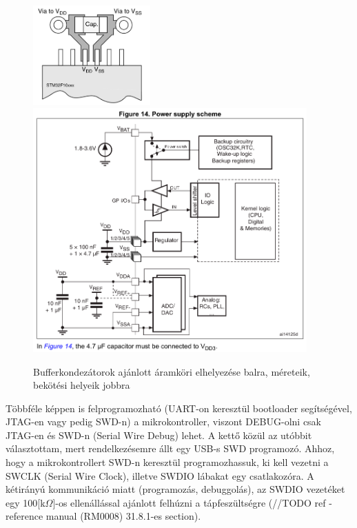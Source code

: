 \documentclass[../main.tex]{subfiles}
\begin{document}
            \begin{figure}[h!]
                \centering
                    \includegraphics[width=4.5cm]{resources/pcb_res/decoup_cap.png}
                    \includegraphics[width=10.5cm]{resources/pcb_res/power_sup_capacitors.png}
                \caption{Bufferkondezátorok ajánlott áramköri elhelyezése balra, méreteik, bekötési helyeik jobbra}
                \label{fig:decoupling_cap}
            \end{figure}
            
            
            Többféle képpen is felprogramozható (UART-on keresztül bootloader segítségével, JTAG-en vagy pedig SWD-n) a mikrokontroller, viszont DEBUG-olni csak JTAG-en és SWD-n (Serial Wire Debug) lehet. A kettő közül az utóbbit választottam, mert rendelkezésemre állt egy USB-s SWD programozó. Ahhoz, hogy a mikrokontrollert SWD-n keresztül programozhassuk, ki kell vezetni a SWCLK (Serial Wire Clock), illetve SWDIO lábakat egy csatlakozóra. A kétirányú kommunikáció miatt (programozás, debuggolás), az SWDIO vezetéket egy 100[k$\Omega$]-os ellenállással ajánlott felhúzni a tápfeszültségre (//TODO ref - reference manual (RM0008) 31.8.1-es section). 
            
\end{document}
